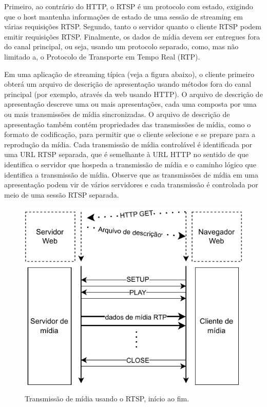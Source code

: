 \documentclass[12pt, %
openright, 
oneside, %
a4paper,    %
brazil]{facom-ufu-abntex2}
\begin{document}
Primeiro, ao contrário do HTTP, o RTSP é um protocolo com estado, exigindo que
o host mantenha informações de estado de uma sessão de streaming em várias
requisições RTSP. Segundo, tanto o servidor quanto o cliente RTSP podem emitir
requisições RTSP. Finalmente, os dados de mídia devem ser entregues fora do
canal principal, ou seja, usando um protocolo separado, como, mas não limitado
a, o Protocolo de Transporte em Tempo Real (RTP).

Em uma aplicação de streaming típica (veja a figura abaixo), o cliente primeiro
obterá um arquivo de descrição de apresentação usando métodos fora do canal
principal (por exemplo, através da web usando HTTP). O arquivo de descrição de
apresentação descreve uma ou mais apresentações, cada uma composta por uma ou
mais transmissões de mídia sincronizadas. O arquivo de descrição de
apresentação também contém propriedades das transmissões de mídia, como o
formato de codificação, para permitir que o cliente selecione e se prepare para
a reprodução da mídia. Cada transmissão de mídia controlável é identificada por
uma URL RTSP separada, que é semelhante à URL HTTP no sentido de que identifica
o servidor que hospeda a transmissão de mídia e o caminho lógico que identifica
a transmissão de mídia. Observe que as transmissões de mídia em uma
apresentação podem vir de vários servidores e cada transmissão é controlada por
meio de uma sessão RTSP separada. \cite{rfc2326}

\clearpage

\begin{figure}[!ht]
	\centering
	\includegraphics[width=0.8\linewidth]{rtsp.pdf}
	\caption[Diagrama RTSP]{Transmissão de mídia usando o RTSP, início ao fim. }
	\label{fig:rtspDiagram}
\end{figure}
\end{document}
